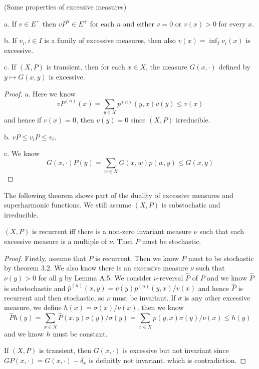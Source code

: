 \documentclass[lang=en,11pt,a4paper,citestyle =authoryear]{elegantpaper}
\begin{document}
\begin{proposition}(Some properties of excessive measures)\par
    a. If $v\in E^+$ then $vP^n\in E^+$ for each $n$ and either $v = 0$ or $v(x) > 0$ for every $x$.\par
    b. If $v_i, i\in I$ is a family of excessive measures, then also $v(x) = \inf_I v_i(x)$ is excessive.\par
    c. If $(X,P)$ is transient, then for each $x\in X$, the measure $G(x,\cdot)$ defined by $y\mapsto G(x,y)$ is excessive.
\end{proposition}
\begin{proof}
    a. Here we know
    \[
    vP^{(n)}(x) = \sum\limits_{y\in X}p^{(n)}(y,x)v(y) \leq v(x)
    \]
    and hence if $v(x) = 0$, then $v(y) = 0$ since $(X,P)$ irreducible.\par
    b. $vP \leq v_i P \leq v_i$.\par
    c. We know
    \[
    G(x,\cdot)P(y) = \sum\limits_{w\in X} G(x,w)p(w,y) \leq G(x,y)
    \]
\end{proof}

The following theorem shows part of the duality of excessive measures and superharmonic functions. We still assume $(X,P)$ is substochatic and irreducible.

\begin{theorem}
    $(X,P)$ is recurrent iff there is a non-zero invariant measure $\nu$ such that each excessive measure is a multiple of $\nu$. Then $P$ must be stochastic.
\end{theorem}
\begin{proof}
    Firstly, assume that $P$ is recurrent. Then we know $P$ must to be stochastic by theorem 3.2. We also know there is an excessive measure $\nu$ such that $\nu(y) > 0$ for all $y$ by Lemma A.5. We consider $\nu$-reversal $\hat{P}$ of $P$ and we know $\hat{P}$ is substochastic and $\hat{p}^{(n)}(x,y) = v(y)p^{(n)}(y,x)/v(x)$ and hence $\hat{P}$ is recurrent and then stochastic, so $\nu$ must be invariant. If $\sigma$ is any other excessive measure, we define $h(x) = \sigma(x)/\nu(x)$, then we know
    \[
    \hat{P}h(y) = \sum\limits_{x\in X}\hat{P}(x,y)\sigma(y)/\sigma(y) = \sum\limits_{x\in X} p(y,x)\sigma(y)/\nu(x) \leq h(y)    \]
    and we know $h$ must be constant.\par
    If $(X,P)$ is transient, then $G(x,\cdot)$ is excessive but not invariant since $GP(x,\cdot) = G(x,\cdot) - \delta_x$ is definitly not invariant, which is contradiction.
\end{proof}
\end{document}
